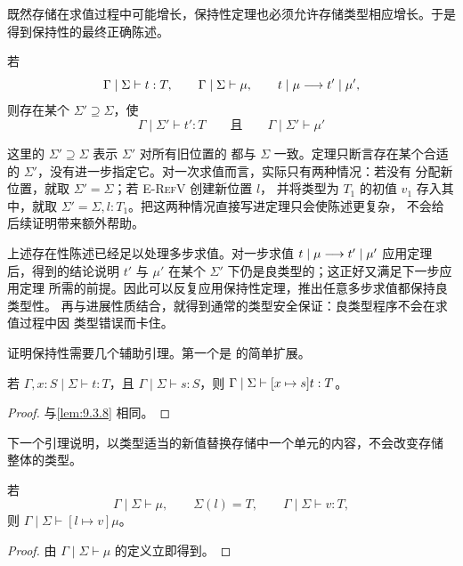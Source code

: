 既然存储在求值过程中可能增长，保持性定理也必须允许存储类型相应增长。于是
得到保持性的最终正确陈述。

\begin{theorem}[保持性]
\label{thm:13.5.3}
若
\[
\Gamma\mid\Sigma\vdash t:T,\qquad
\Gamma\mid\Sigma\vdash\mu,\qquad
t\mid\mu\mathrel{\longrightarrow} t'\mid\mu',
\]
则存在某个 \(\Sigma'\supseteq\Sigma\)，使
\[
\Gamma\mid\Sigma'\vdash t':T
\qquad\text{且}\qquad
\Gamma\mid\Sigma'\vdash\mu'
\]
\end{theorem}

这里的 \(\Sigma'\supseteq\Sigma\) 表示 \(\Sigma'\) 对所有旧位置的
都与 \(\Sigma\) 一致。定理只断言存在某个合适的
\(\Sigma'\)，没有进一步指定它。对一次求值而言，实际只有两种情况：若没有
分配新位置，就取 \(\Sigma'=\Sigma\)；若 \textsc{E-RefV} 创建新位置 \(l\)，
并将类型为 \(T_1\) 的初值 \(v_1\) 存入其中，就取
\(\Sigma'=\Sigma,l:T_1\)。把这两种情况直接写进定理只会使陈述更复杂，
不会给后续证明带来额外帮助。

上述存在性陈述已经足以处理多步求值。对一步求值
\(t\mid\mu\mathrel{\longrightarrow} t'\mid\mu'\) 应用定理后，得到的结论说明 \(t'\) 与
\(\mu'\) 在某个 \(\Sigma'\) 下仍是良类型的；这正好又满足下一步应用定理
所需的前提。因此可以反复应用保持性定理，推出任意多步求值都保持良类型性。
再与进展性质结合，就得到通常的类型安全保证：良类型程序不会在求值过程中因
类型错误而卡住。

证明保持性需要几个辅助引理。第一个是
的简单扩展。

\begin{lemma}[替换]
\label{lem:13.5.4}
若 \(\Gamma,x:S\mid\Sigma\vdash t:T\)，且
\(\Gamma\mid\Sigma\vdash s:S\)，则
\(\Gamma\mid\Sigma\vdash[x\mapsto s]t:T\)。
\end{lemma}

\begin{proof}
与\cref{lem:9.3.8} 相同。
\end{proof}

下一个引理说明，以类型适当的新值替换存储中一个单元的内容，不会改变存储
整体的类型。

\begin{lemma}
\label{lem:13.5.5}
若
\[
\Gamma\mid\Sigma\vdash\mu,\qquad
\Sigma(l)=T,\qquad
\Gamma\mid\Sigma\vdash v:T,
\]
则 \(\Gamma\mid\Sigma\vdash[l\mapsto v]\mu\)。
\end{lemma}

\begin{proof}
由 \(\Gamma\mid\Sigma\vdash\mu\) 的定义立即得到。
\end{proof}

